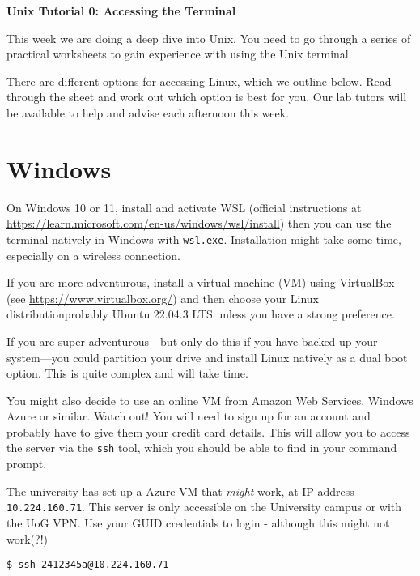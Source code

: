 \documentclass{article}
\begin{document}
\noindent
{\Large \textsf{\textbf{Unix Tutorial 0: Accessing the Terminal}}}

\bigskip




This week we are doing a deep dive into Unix. You need to go
through a series of practical worksheets to gain experience with
using the Unix terminal.

There are different options for accessing Linux, which we outline
below. Read through the sheet and work out which option is best
for you. Our lab tutors will be available to help and advise each
afternoon this week.



\section*{Windows}

On Windows 10 or 11, install and activate WSL (official instructions at \url{https://learn.microsoft.com/en-us/windows/wsl/install}) then you can use the terminal natively in Windows with \texttt{wsl.exe}. Installation might take some time, especially on a wireless connection.

If you are more adventurous, install a virtual machine (VM) using VirtualBox
(see \url{https://www.virtualbox.org/}) and then choose your Linux distributionprobably Ubuntu 22.04.3 LTS unless you have a strong preference.

If you are super adventurous---but only do this if you have backed up your system---you could partition your drive and install Linux natively as a dual boot option. This is quite complex and will take time.

You might also decide to use an online VM from Amazon Web Services, Windows Azure or similar. Watch out! You will need to sign up for an account and probably have to give them your credit card details.
This will allow you to access the server via the \texttt{ssh} tool, which you should be able to find in your command prompt.

The university has set up a Azure VM that \emph{might} work, at IP address
\texttt{10.224.160.71}. This server is only accessible on the University campus or with the UoG VPN.
Use your GUID credentials to login - although this might not work(?!)

\begin{lstlisting}[style=BashInputStyle]
  $ ssh 2412345a@10.224.160.71
\end{lstlisting}
\end{document}
